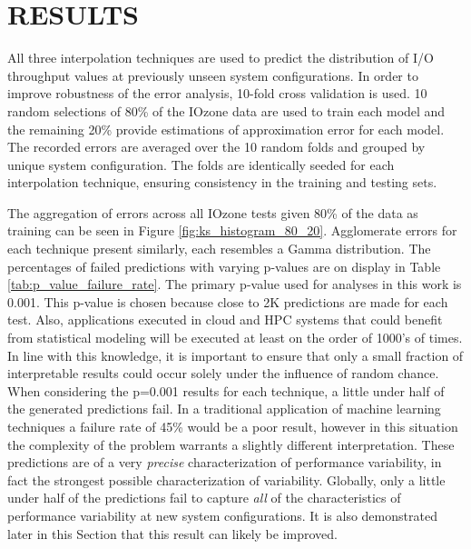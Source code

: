 \documentclass[letterpaper, 10 pt, conference]{ieeeconf}  %
\begin{document}
\section{RESULTS}
\label{sec:results}

All three interpolation techniques are used to predict the distribution of I/O throughput values at previously unseen system configurations. In order to improve robustness of the error analysis, 10-fold cross validation is used. 10 random selections of 80\% of the IOzone data are used to train each model and the remaining 20\% provide estimations of approximation error for each model. The recorded errors are averaged over the 10 random folds and grouped by unique system configuration. The folds are identically seeded for each interpolation technique, ensuring consistency in the training and testing sets.

The aggregation of errors across all IOzone tests given 80\% of the data as training can be seen in Figure \ref{fig:ks_histogram_80_20}. Agglomerate errors for each technique present similarly, each resembles a Gamma distribution. The percentages of failed predictions with varying p-values are on display in Table \ref{tab:p_value_failure_rate}. The primary p-value used for analyses in this work is 0.001. This p-value is chosen because close to 2K predictions are made for each test. Also, applications executed in cloud and HPC systems that could benefit from statistical modeling will be executed at least on the order of 1000's of times. In line with this knowledge, it is important to ensure that only a small fraction of interpretable results could occur solely under the influence of random chance. When considering the p=0.001 results for each technique, a little under half of the generated predictions fail. In a traditional application of machine learning techniques a failure rate of 45\% would be a poor result, however in this situation the complexity of the problem warrants a slightly different interpretation. These predictions are of a very \textit{precise} characterization of performance variability, in fact the strongest possible characterization of variability. Globally, only a little under half of the predictions fail to capture \textit{all} of the characteristics of performance variability at new system configurations. It is also demonstrated later in this Section that this result can likely be improved.
\end{document}

